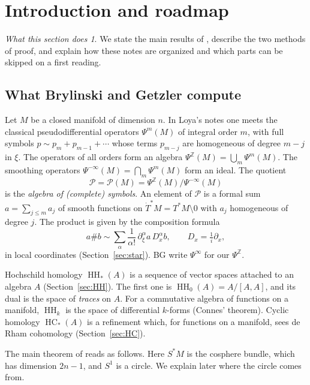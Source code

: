 \documentclass[11pt,oneside,reqno]{article}
\DeclareMathOperator{\HH}{HH}
\DeclareMathOperator{\HC}{HC}
\newcommand{\Z}{\mathbb Z}
\newcommand{\cP}{\mathcal P}
\newcommand{\Tdot}{\dot T^*}
\newcommand{\pa}{\partial}
\theoremstyle{plain}
\theoremstyle{definition}
\theoremstyle{remark}
\newtheorem*{whatdoes}{What this section does}
\begin{document}
\section{Introduction and roadmap}\label{sec:intro}

\begin{whatdoes}
We state the main results of \cite{BG}, describe the two methods of
proof, and explain how these notes are organized and which parts can be
skipped on a first reading.
\end{whatdoes}

\subsection{What Brylinski and Getzler compute}\label{subsec:what}
Let \(M\) be a closed manifold of dimension \(n\). In Loya's notes
\cite{LoyaAS} one meets the classical pseudodifferential operators
\(\Psi^m(M)\) of integral order \(m\), with full symbols
\(p\sim p_m+p_{m-1}+\cdots\) whose terms \(p_{m-j}\) are homogeneous of
degree \(m-j\) in \(\xi\). The operators of all orders form an algebra
\(\Psi^{\Z}(M)=\bigcup_m\Psi^m(M)\). The smoothing operators
\(\Psi^{-\infty}(M)=\bigcap_m\Psi^m(M)\) form an ideal. The quotient
\[
 \cP=\cP(M)=\Psi^{\Z}(M)/\Psi^{-\infty}(M)
\]
is the \emph{algebra of (complete) symbols}. An element of \(\cP\) is a
formal sum \(a=\sum_{j\le m}a_j\) of smooth functions on
\(\Tdot M=T^*M\setminus0\) with \(a_j\) homogeneous of degree \(j\). The
product is given by the composition formula
\begin{equation}\label{eq:intro-comp}
 a\# b\sim\sum_\alpha\frac1{\alpha!}\,\pa_\xi^\alpha a\,D_x^\alpha b,
 \qquad D_x=\tfrac1i\pa_x ,
\end{equation}
in local coordinates (Section~\ref{sec:star}). BG write \(\Psi^\infty\) for
our \(\Psi^{\Z}\).

Hochschild homology \(\HH_*(A)\) is a sequence of vector spaces attached to
an algebra \(A\) (Section~\ref{sec:HH}). The first one is
\(\HH_0(A)=A/[A,A]\), and its dual is the space of \emph{traces} on \(A\).
For a commutative algebra of functions on a manifold, \(\HH_k\) is the
space of differential \(k\)-forms (Connes' theorem). Cyclic homology
\(\HC_*(A)\) is a refinement which, for functions on a manifold, sees de
Rham cohomology (Section~\ref{sec:HC}).

The main theorem of \cite{BG} reads as follows. Here \(S^*M\) is the
cosphere bundle, which has dimension \(2n-1\), and \(S^1\) is a circle.
We explain later where the circle comes from.
\end{document}
